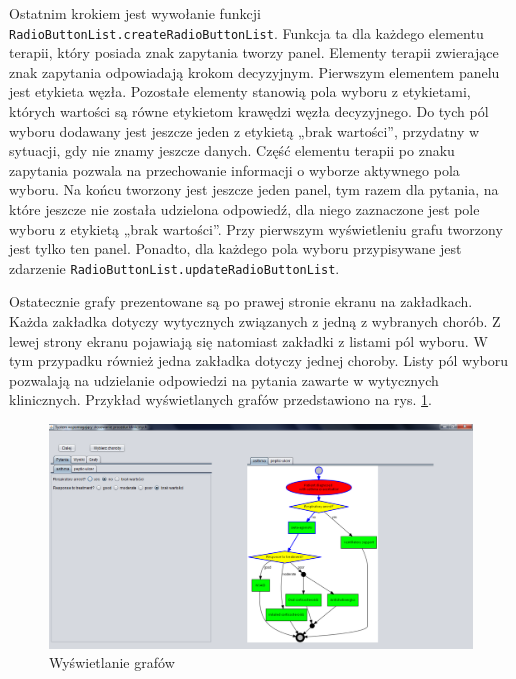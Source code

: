Ostatnim krokiem jest wywołanie funkcji \texttt{RadioButtonList.createRadioButtonList}. 
Funkcja ta dla każdego elementu terapii, który posiada znak zapytania tworzy panel. Elementy terapii zwierające znak zapytania odpowiadają krokom decyzyjnym. Pierwszym elementem panelu jest etykieta węzła. 
Pozostałe elementy stanowią pola wyboru z etykietami, których wartości są równe etykietom krawędzi węzła decyzyjnego. 
Do tych pól wyboru dodawany jest jeszcze jeden z etykietą „brak wartości”, przydatny w sytuacji, gdy nie znamy jeszcze danych. 
Część elementu terapii po znaku zapytania pozwala na przechowanie informacji o wyborze aktywnego pola wyboru. 
Na końcu tworzony jest jeszcze jeden panel, tym razem dla pytania, na które jeszcze nie została udzielona odpowiedź, dla niego zaznaczone jest pole wyboru z etykietą „brak wartości”. Przy pierwszym wyświetleniu grafu tworzony jest tylko ten panel. Ponadto, dla każdego pola wyboru przypisywane jest zdarzenie \texttt{RadioButtonList.updateRadioButtonList}.
 
Ostatecznie grafy prezentowane są po prawej stronie ekranu na zakładkach. Każda zakładka dotyczy wytycznych związanych z jedną z wybranych chorób. Z lewej strony ekranu pojawiają się natomiast zakładki z listami pól wyboru. W tym przypadku również jedna zakładka dotyczy jednej choroby. Listy pól wyboru pozwalają na udzielanie odpowiedzi na pytania zawarte w wytycznych klinicznych. 
Przykład wyświetlanych grafów przedstawiono na rys. \ref{fig:wyswietlanie_grafow}.
\begin{figure}[H]
\centering
\includegraphics[width=\textwidth]{img/wyswietlanie_grafow.png}
\caption{Wyświetlanie grafów}
\label{fig:wyswietlanie_grafow}
\end{figure}

